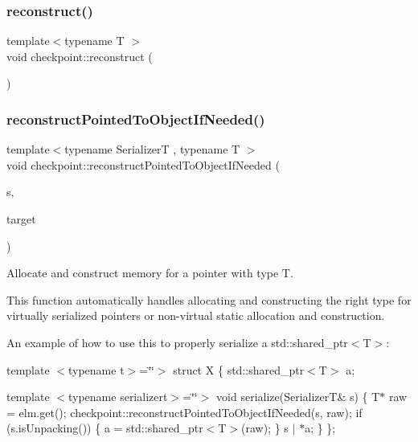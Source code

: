 \subsubsection{\texorpdfstring{reconstruct()}{reconstruct()}}
{\footnotesize\ttfamily template$<$typename T $>$ \\
void checkpoint\+::reconstruct (\begin{DoxyParamCaption}\item[{T}]{ }\end{DoxyParamCaption})}

\mbox{\label{namespacecheckpoint_a9ffb72abb4d8c3fe031626dbf526d70c}} 
\subsubsection{\texorpdfstring{reconstruct\+Pointed\+To\+Object\+If\+Needed()}{reconstructPointedToObjectIfNeeded()}}
{\footnotesize\ttfamily template$<$typename SerializerT , typename T $>$ \\
void checkpoint\+::reconstruct\+Pointed\+To\+Object\+If\+Needed (\begin{DoxyParamCaption}\item[{SerializerT \&}]{s,  }\item[{T $\ast$\&}]{target }\end{DoxyParamCaption})}



Allocate and construct memory for a pointer with type {\ttfamily T}. 

This function automatically handles allocating and constructing the right type for virtually serialized pointers or non-\/virtual static allocation and construction.

An example of how to use this to properly serialize a std\+::shared\+\_\+ptr$<$\+T$>$\+:

template $<$typename t$>$=\char`\"{}\char`\"{}$>$ struct X \{ std\+::shared\+\_\+ptr$<$\+T$>$ a;

template $<$typename serializert$>$=\char`\"{}\char`\"{}$>$ void serialize(\+Serializer\+T\& s) \{ T$\ast$ raw = elm.\+get(); checkpoint\+::reconstruct\+Pointed\+To\+Object\+If\+Needed(s, raw); if (s.\+is\+Unpacking()) \{ a = std\+::shared\+\_\+ptr$<$\+T$>$(raw); \} s $\vert$ $\ast$a; \} \};


